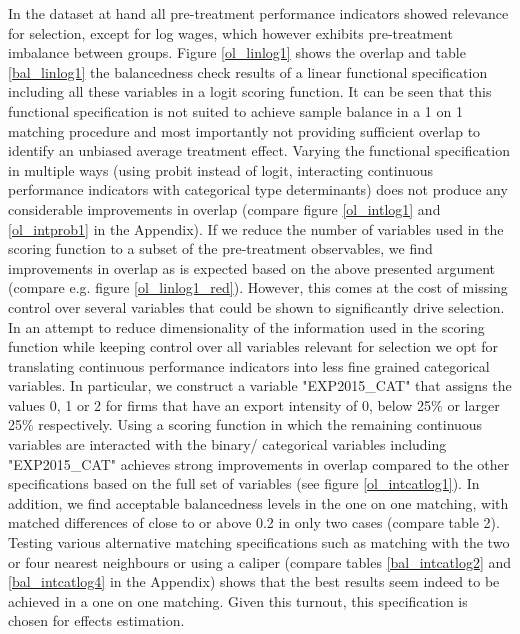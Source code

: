 \documentclass[11pt,a4paper,leqno]{article}
\begin{document}
 In the dataset at hand all pre-treatment performance indicators showed relevance for selection, except for log wages, which however exhibits pre-treatment imbalance between groups. Figure \ref{ol_linlog1} shows the overlap and table \ref{bal_linlog1} the balancedness check results of a linear functional specification including all these variables in a logit scoring function. It can be seen that this functional specification is not suited to achieve sample balance in a 1 on 1 matching procedure and most importantly not providing sufficient overlap to identify an unbiased average treatment effect. Varying the functional specification in multiple ways (using probit instead of logit, interacting continuous performance indicators with categorical type determinants) does not produce any considerable improvements in overlap (compare figure \ref{ol_intlog1} and \ref{ol_intprob1} in the Appendix). If we reduce the number of variables used in the scoring function to a subset of the pre-treatment observables, we find improvements in overlap as is expected based on the above presented argument (compare e.g. figure \ref{ol_linlog1_red}). However, this comes at the cost of missing control over several variables that could be shown to significantly drive selection. In an attempt to reduce dimensionality of the information used in the scoring function while keeping control over all variables relevant for selection we opt for translating continuous performance indicators into less fine grained categorical variables. In particular, we construct a variable "EXP2015\_CAT" that assigns the values 0, 1 or 2 for firms that have an export intensity of 0, below 25\% or larger 25\% respectively. Using a scoring function in which the remaining continuous variables are interacted with the binary/ categorical variables including "EXP2015\_CAT" achieves strong improvements in overlap compared to the other specifications based on the full set of variables (see figure \ref{ol_intcatlog1}). In addition, we find acceptable balancedness levels in the one on one matching, with matched differences of close to or above 0.2 in only two cases (compare table 2). Testing various alternative matching specifications such as matching with the two or four nearest neighbours or using a caliper (compare tables \ref{bal_intcatlog2} and \ref{bal_intcatlog4} in the Appendix) shows that the best results seem indeed to be achieved in a one on one matching. Given this turnout, this specification is chosen for effects estimation.\\ \par
\end{document}
